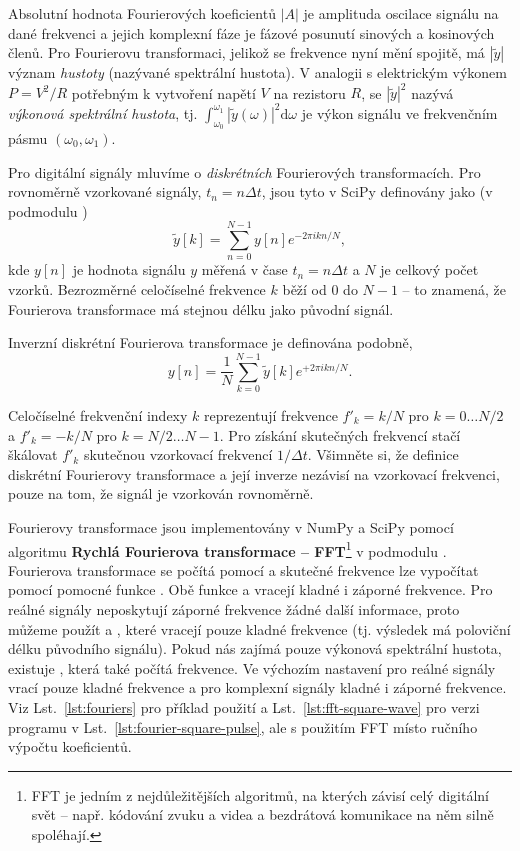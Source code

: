 Absolutní hodnota Fourierových koeficientů $|A|$ je amplituda oscilace signálu na dané frekvenci a jejich komplexní fáze je fázové posunutí sinových a kosinových členů. Pro Fourierovu transformaci, jelikož se frekvence nyní mění spojitě, má $|\tilde y|$ význam \emph{hustoty} (nazývané spektrální hustota). V analogii s elektrickým výkonem $P = V^2/R$ potřebným k vytvoření napětí $V$ na rezistoru $R$, se $|\tilde y|^2$ nazývá \emph{výkonová spektrální hustota}, tj. $\int_{\omega_0}^{\omega_1} |\tilde y (\omega)|^2\mathrm{d}\omega$ je výkon signálu ve frekvenčním pásmu $(\omega_0, \omega_1)$.

Pro digitální signály mluvíme o \emph{diskrétních} Fourierových transformacích. Pro rovnoměrně vzorkované signály, $t_n = n\Delta t$, jsou tyto v SciPy definovány jako (v podmodulu )
\begin{equation}
    \tilde y[k] = \sum_{n=0}^{N-1}y[n]e^{-2\pi i kn/N},
\end{equation}
kde $y[n]$ je hodnota signálu $y$ měřená v čase $t_n = n\Delta t$ a $N$ je celkový počet vzorků. Bezrozměrné celočíselné frekvence $k$ běží od 0 do $N-1$ -- to znamená, že Fourierova transformace má stejnou délku jako původní signál.

Inverzní diskrétní Fourierova transformace je definována podobně,
\begin{equation}
    y[n] = \frac{1}{N}\sum_{k=0}^{N-1}\tilde y[k]e^{+2\pi i kn/N}.
\end{equation}

Celočíselné frekvenční indexy $k$ reprezentují frekvence $f'_k = k/N$ pro $k=0\dots N/2$ a $f'_k = -k/N$ pro $k=N/2\dots N-1$. Pro získání skutečných frekvencí stačí škálovat $f'_k$ skutečnou vzorkovací frekvencí $1/\Delta t$. Všimněte si, že definice diskrétní Fourierovy transformace a její inverze nezávisí na vzorkovací frekvenci, pouze na tom, že signál je vzorkován rovnoměrně.

Fourierovy transformace jsou implementovány v NumPy a SciPy pomocí algoritmu \textbf{Rychlá Fourierova transformace -- FFT}\footnote{FFT je jedním z nejdůležitějších algoritmů, na kterých závisí celý digitální svět -- např. kódování zvuku a videa a bezdrátová komunikace na něm silně spoléhají.} v podmodulu . Fourierova transformace se počítá pomocí  a skutečné frekvence lze vypočítat pomocí pomocné funkce . Obě funkce  a  vracejí kladné i záporné frekvence. Pro reálné signály neposkytují záporné frekvence žádné další informace, proto můžeme použít  a , které vracejí pouze kladné frekvence (tj. výsledek má poloviční délku původního signálu). Pokud nás zajímá pouze výkonová spektrální hustota, existuje , která také počítá frekvence. Ve výchozím nastavení pro reálné signály vrací  pouze kladné frekvence a pro komplexní signály kladné i záporné frekvence. Viz Lst.~\ref{lst:fouriers} pro příklad použití a Lst.~\ref{lst:fft-square-wave} pro verzi programu v Lst.~\ref{lst:fourier-square-pulse}, ale s použitím FFT místo ručního výpočtu koeficientů.

